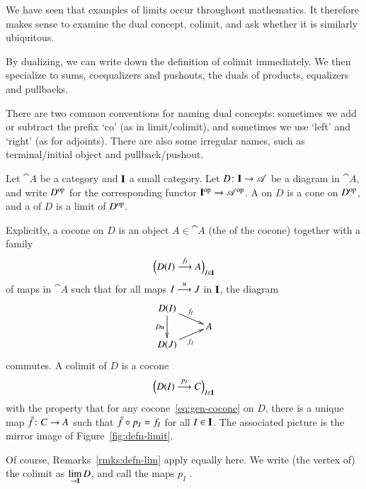 We have seen that examples of limits occur throughout mathematics.  It
therefore makes sense to examine the dual concept, colimit, and ask whether
it is similarly ubiquitous.

By dualizing, we can write down the definition of colimit immediately.  We
then specialize to sums, coequalizers and pushouts, the duals of products,
equalizers and pullbacks.

There are two common conventions for naming dual%
%
%
concepts: sometimes we add or subtract the prefix `co' (as in
limit/colimit), and sometimes we use `left' and `right' (as for adjoints).
There are also some irregular names, such as terminal/initial object and
pullback/pushout.

\begin{defn}
Let $\cat{A}$ be a category and $\mathbf{I}$ a small category.  Let $D\from
\scat{I} \to \cat{A}$ be a diagram in $\cat{A}$, and write $D^{\mathrm{op}}$ for the
corresponding functor $\mathbf{I}^{\mathrm{op}} \to \mathscr{A}^{\mathrm{op}}$.  A %
%
%
on $D$ is a cone on $D^{\mathrm{op}}$, and a %
%
%
of $D$ is a limit of $D^{\mathrm{op}}$.
\end{defn}

Explicitly, a cocone on $D$ is an object $A \in \cat{A}$ (the
%
%
%
of the cocone) together with a family
% 
\begin{equation}        
\label{eq:gen-cocone}
\Bigl(
D(I) \stackrel{f_I}{\longrightarrow} A
\Bigr)_{I \in \mathbf{I}}
\end{equation}
% 
of maps in $\cat{A}$ such that for all maps $I \stackrel{u}{\longrightarrow} J$ in $\mathbf{I}$, the
diagram 
\[
\xymatrix@R=1ex{
D(I) \ar[dd]_{Du} \ar[rd]^{f_I} &       \\
                                &A      \\
D(J) \ar[ru]_{f_J}
}
\]
commutes.  A colimit of $D$ is a cocone 
\[
\Bigl(D(I) \stackrel{p_I}{\longrightarrow} C\Bigr)_{I \in \mathbf{I}}
\]
with the property that for any cocone~\eqref{eq:gen-cocone} on
$D$, there is a unique map $\bar{f}\from C \to A$%
%
%
such that $\bar{f} \mathbin{\circ} p_I = f_I$ for all $I \in \mathbf{I}$.  The associated
picture is the mirror image of Figure~\ref{fig:defn-limit}.

Of course, Remarks~\ref{rmks:defn-lim} apply equally here.  We write (the
vertex of) the colimit as $\lim\limits_{\rightarrow \mathbf{I}} D$,%
%
%
and call the maps $p_I$ .%
%
%



